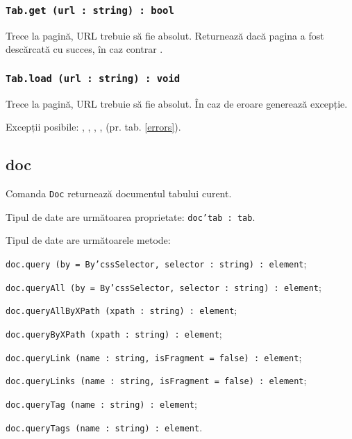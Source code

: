 \subsubsection{\texttt{Tab.get (url : string) : bool}}

Trece la pagină, URL trebuie să fie absolut. Returnează \true{} dacă pagina a fost descărcată cu succes, în caz contrar \false.

\subsubsection{\texttt{Tab.load (url : string) : void}}

Trece la pagină, URL trebuie să fie absolut. În caz de eroare generează excepție.

Excepții posibile: , , , ,  (pr. tab. \ref{errors}).

\subsection{{\color{orange} doc}}

Comanda \texttt{Doc} returnează documentul tabului curent.

Tipul de date \dom{} are următoarea proprietate: \texttt{doc'tab : tab}.

Tipul de date \dom{} are următoarele metode:
\begin{icItems}
	\item \texttt{doc.query (by = By'cssSelector, selector : string) : element};
	\item \texttt{doc.queryAll (by = By'cssSelector, selector : string) : element};
	\item \texttt{doc.queryAllByXPath (xpath : string) : element};
	\item \texttt{doc.queryByXPath (xpath : string) : element};
	\item \texttt{doc.queryLink (name : string, isFragment = false) : element};
	\item \texttt{doc.queryLinks (name : string, isFragment = false) : element};
	\item \texttt{doc.queryTag (name : string) : element};
	\item \texttt{doc.queryTags (name : string) : element}.
\end{icItems}


